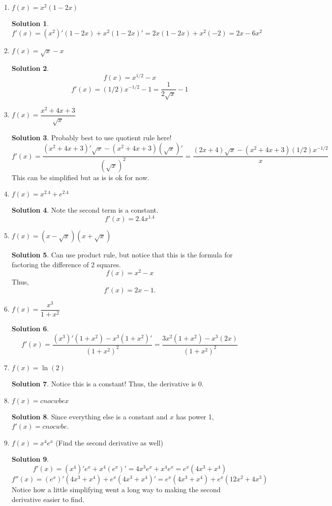 \documentclass[10pt]{article}
\theoremstyle{Theorem}
\theoremstyle{definition}
\newtheorem*{solution}{Solution}
\theoremstyle{remark}
\theoremstyle{custom}
\begin{document}
\begin{enumerate}[1.]
\item $f(x)=x^2(1-2x)$
\begin{solution}
\[
f'(x)=(x^2)'(1-2x)+x^2(1-2x)'=2x(1-2x)+x^2(-2)=2x-6x^2
\]
\end{solution}
\item $f(x)=\sqrt{x}-x$
\begin{solution}
\[
f(x)=x^{1/2}-x
\]
\[
f'(x)=(1/2)x^{-1/2}-1=\dfrac{1}{2\sqrt{x}}-1
\]
\end{solution}
\item $f(x)=\dfrac{x^2+4x+3}{\sqrt{x}}$
\begin{solution}
Probably best to use quotient rule here!
\[
f'(x)=\dfrac{(x^2+4x+3)'\sqrt{x}-(x^2+4x+3)(\sqrt{x})'}{(\sqrt{x})^2}=\dfrac{(2x+4)\sqrt{x}-(x^2+4x+3)(1/2)x^{-1/2}}{x}
\]
This can be simplified but as is is ok for now.
\end{solution}
\item $f(x)=x^{2.4}+e^{2.4}$
\begin{solution}
Note the second term is a constant.
\[
f'(x)=2.4x^{1.4}
\]
\end{solution}
\item $f(x)=(x-\sqrt{x})(x+\sqrt{x})$
\begin{solution}
Can use product rule, but notice that this is the formula for factoring the difference of 2 squares.
\[
f(x)=x^2-x
\]
Thus,
\[
f'(x)=2x-1.
\]
\end{solution}
\item $f(x)=\dfrac{x^3}{1+x^2}$
\begin{solution}
\[
f'(x)=\dfrac{(x^3)'(1+x^2)-x^3(1+x^2)'}{(1+x^2)^2}=\dfrac{3x^2(1+x^2)-x^3(2x)}{(1+x^2)^2}
\]
\end{solution}
\item $f(x)=\ln(2)$
\begin{solution}
Notice this is a constant! Thus, the derivative is 0.
\end{solution}
\item $f(x)=cnocwbex$
\begin{solution}
Since everything else is a constant and $x$ has power 1, $f'(x)=cnocwbe$.
\end{solution}
\item $f(x)=x^4e^x$ (Find the second derivative as well)
\begin{solution}
\[
f'(x)=(x^4)'e^x+x^4(e^x)'=4x^3e^x+x^4e^x=e^x (4x^3+x^4)
\]
\[
f''(x)=(e^x)'(4x^3+x^4)+e^x(4x^3+x^4)'=e^x(4x^3+x^4)+e^x(12x^2+4x^3)
\]
Notice how a little simplifying went a long way to making the second derivative easier to find.

\end{solution}
\end{enumerate}
\end{document}
